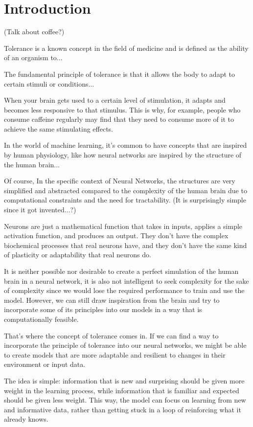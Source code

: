\section{Introduction}

    (Talk about coffee?)

    Tolerance is a known concept in the field of medicine and is defined as the ability of an organism to...
    
    The fundamental principle of tolerance is that it allows the body to adapt to certain stimuli or conditions... 

    When your brain gets used to a certain level of stimulation, it adapts and becomes less responsive to that stimulus. This is why, for example, people who consume caffeine regularly may find that they need to consume more of it to achieve the same stimulating effects.

    In the world of machine learning, it's common to have concepts that are inspired by human physiology, like how neural networks are inspired by the structure of the human brain...

    Of course, In the specific context of Neural Networks, the structures are very simplified and abstracted compared to the complexity of the human brain due to computational constraints and the need for tractability. (It is surprisingly simple since it got invented...?)

    Neurons are just a mathematical function that takes in inputs, applies a simple activation function, and produces an output. They don't have the complex biochemical processes that real neurons have, and they don't have the same kind of plasticity or adaptability that real neurons do.

    It is neither possible nor desirable to create a perfect simulation of the human brain in a neural network, it is also not intelligent to seek complexity for the sake of complexity since we would lose the required performance to train and use the model. However, we can still draw inspiration from the brain and try to incorporate some of its principles into our models in a way that is computationally feasible.

    That's where the concept of tolerance comes in. If we can find a way to incorporate the principle of tolerance into our neural networks, we might be able to create models that are more adaptable and resilient to changes in their environment or input data.

    The idea is simple: information that is new and surprising should be given more weight in the learning process, while information that is familiar and expected should be given less weight. This way, the model can focus on learning from new and informative data, rather than getting stuck in a loop of reinforcing what it already knows.


